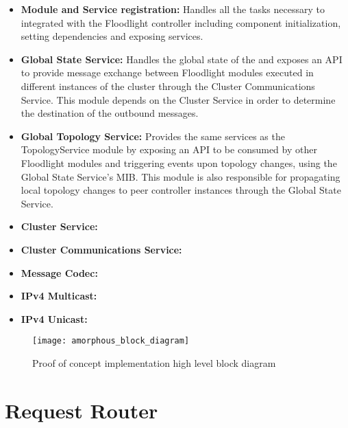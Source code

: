 \begin{itemize}
	\item \textbf{Module and Service registration:} Handles all the tasks necessary to integrated with the Floodlight controller including component initialization, setting dependencies and exposing services.
	\item \textbf{Global State Service:} Handles the global state of the  and exposes an \gls{API} to provide message exchange between Floodlight modules executed in different instances of the cluster through the Cluster Communications Service. This module depends on the Cluster Service in order to determine the destination of the outbound messages.
	\item \textbf{Global Topology Service:} Provides the same services as the TopologyService module by exposing an \gls{API} to be consumed by other Floodlight modules and triggering events upon topology changes, using the Global State Service's \gls{MIB}. This module is also responsible for propagating local topology changes to peer controller instances through the Global State Service.
	\item \textbf{Cluster Service:} 
	\item \textbf{Cluster Communications Service:} 
	\item \textbf{Message Codec:} 
	\item \textbf{IPv4 Multicast:} 
	\item \textbf{IPv4 Unicast:} 
\end{itemize}
%
\begin{figure}
	\centering
	\texttt{[image: amorphous\_block\_diagram]}
	\caption{Proof of concept implementation high level block diagram}
	\label{fig:amorphous_block_diagram}
\end{figure}
%



%
\section{Request Router}
\label{section:request-router}

